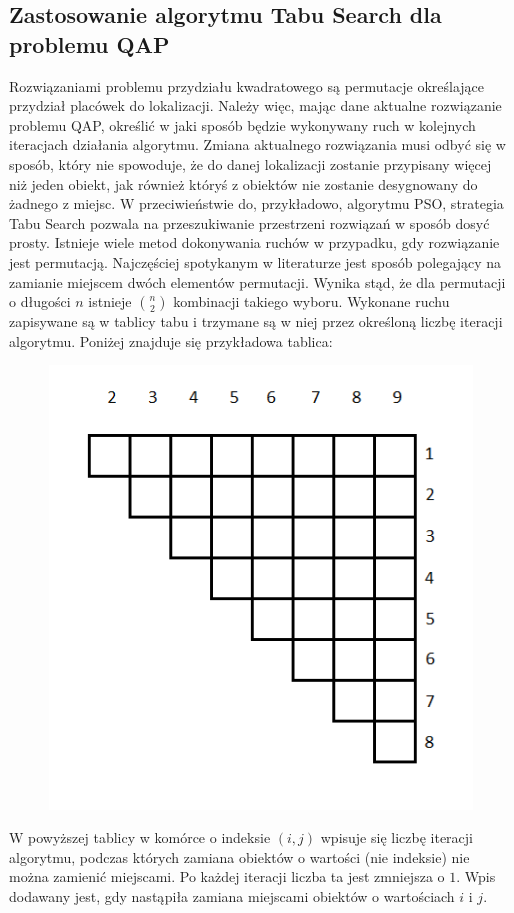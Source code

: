 \subsection{Zastosowanie algorytmu Tabu Search dla problemu QAP}
Rozwiązaniami problemu przydziału kwadratowego są permutacje określające przydział placówek do lokalizacji. Należy więc, mając dane aktualne rozwiązanie problemu QAP, określić w jaki sposób będzie wykonywany ruch w kolejnych iteracjach działania algorytmu. Zmiana aktualnego rozwiązania musi odbyć się w sposób, który nie spowoduje, że do danej lokalizacji zostanie przypisany więcej niż jeden obiekt, jak również któryś z obiektów nie zostanie desygnowany do żadnego z miejsc. W przeciwieństwie do, przykładowo, algorytmu PSO, strategia Tabu Search pozwala na przeszukiwanie przestrzeni rozwiązań w sposób dosyć prosty. Istnieje wiele metod dokonywania ruchów w przypadku, gdy rozwiązanie jest permutacją. Najczęściej spotykanym w literaturze jest sposób polegający na zamianie miejscem dwóch elementów permutacji. Wynika stąd, że dla permutacji o długości $n$ istnieje $n\choose 2$ kombinacji takiego wyboru. Wykonane ruchu zapisywane są w tablicy tabu i trzymane są w niej przez określoną liczbę iteracji algorytmu. Poniżej znajduje się przykładowa tablica:
\begin{figure}[h]
\includegraphics[scale=0.8]{tabu}
\end{figure}

W powyższej tablicy w komórce o indeksie $(i,j)$ wpisuje się liczbę iteracji algorytmu, podczas których zamiana obiektów o wartości (nie indeksie) nie można zamienić miejscami. Po każdej iteracji liczba ta jest zmniejsza o $1$. Wpis dodawany jest, gdy nastąpiła zamiana miejscami obiektów o wartościach $i$ i $j$.

